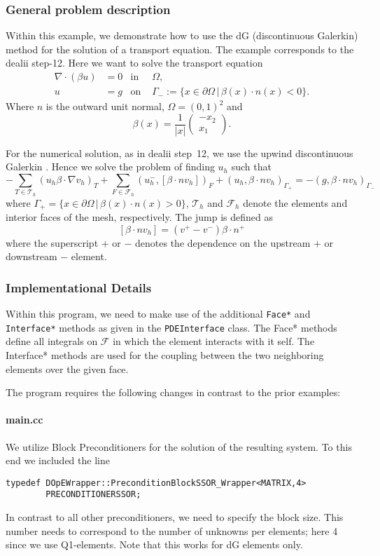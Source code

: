 \subsubsection{General problem description}
Within this example, we demonstrate how to use the
dG (discontinuous Galerkin) method for the solution of 
a transport equation. The example corresponds to 
the dealii step-12. Here we want to solve the transport equation 
\begin{align*}
 \nabla \cdot (\beta u) &= 0 & \text{in }&\Omega,\\
 u &= g &\text{on }&\Gamma_- := \{ x \in \partial \Omega\,|\, \beta(x) \cdot n(x) < 0\}.
\end{align*}
Where $n$ is the outward unit normal, $\Omega = (0,1)^2$ and 
\[
\beta(x) = \frac{1}{|x|} \begin{pmatrix} -x_2\\x_1
  \end{pmatrix}.
\]

For the numerical solution, as in dealii step~12, we use the upwind discontinuous 
Galerkin . Hence we solve the problem of finding $u_h$ 
such that 
\[
 -\sum_{T \in \mathcal T_h} (u_h \beta \cdot  \nabla v_h)_T 
 + \sum_{F \in \mathcal F_h} (u_h^-,[\beta \cdot n v_h])_F + (u_h,\beta \cdot n v_h)_{\Gamma_+} = -(g,\beta \cdot n v_h)_{\Gamma_-}
\]
where $\Gamma_+ =  \{ x \in \partial \Omega\,|\, \beta(x) \cdot n(x) > 0\}$, $\mathcal T_h$ and $\mathcal F_h$ denote the 
elements and interior faces of the mesh, respectively. The jump is defined as 
\[
[\beta \cdot n v_h] = (v^+ - v^-) \beta \cdot n^+
\]
where the superscript $+$ or $-$ denotes the dependence on the upstream $+$ or downstream $-$ element.

\subsubsection{Implementational Details}
Within this program, we need to make use of the additional \texttt{Face*} and \texttt{Interface*} methods as given in the  
\texttt{PDEInterface} class. The Face* methods define all integrals on $\mathcal F$ in which the element interacts 
with it self. The Interface* methods are used for the coupling between the two neighboring elements over the 
given face.

The program requires the following changes in contrast to the prior examples:

\paragraph{main.cc} We utilize Block Preconditioners for the solution of the resulting system. 
To this end we included the line
\begin{verbatim}
typedef DOpEWrapper::PreconditionBlockSSOR_Wrapper<MATRIX,4> 
        PRECONDITIONERSSOR; 
\end{verbatim}
In contrast to all other preconditioners, we need to specify the block size. This number needs 
to correspond to the number of unknowns per elements; here 4 since we use Q1-elements. Note that this works for dG
elements only.

